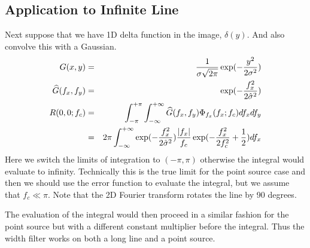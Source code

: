 \documentclass{article}
\DeclarePairedDelimiter\abs{\lvert}{\rvert}%
\begin{document}
\subsection{Application to Infinite Line}
Next suppose that we have 1D delta function in the image, $ \delta(y) $. And also convolve this with a Gaussian.
\begin{eqnarray}
	G(x,y) & = & \frac{1}{\sigma \sqrt{2 \pi}} \exp(-\frac{y^2}{2\sigma^2}) \\
	\widehat{G}(f_x,f_y) & = & \exp(-\frac{f_x^2}{2 \hat{\sigma}^2}) \\
	R(0,0; f_c) & = & \int_{-\pi}^{+\pi} \int_{-\infty}^{+\infty} \widehat{G}(f_x,f_y) \Phi_{f_x}(f_x; f_c) df_x df_y \\
    & = & 2 \pi \int_{-\infty}^{+\infty} \exp(-\frac{f_x^2}{2\hat{\sigma}^2})  \frac{\abs {f_x}}{f_c} \exp(-\frac{f_x^2}{2f_c^2}+\frac{1}{2}) df_x  \\
\end{eqnarray}
Here we switch the limits of integration to $ (-\pi,\pi) $ otherwise the integral would evaluate to infinity. Technically this is the true limit for the point source case and then we should use the error function to evaluate the integral, but we assume that $ f_c \ll \pi $. Note that the 2D Fourier transform rotates the line by 90 degrees.
\par
The evaluation of the integral would then proceed in a similar fashion for the point source but with a different constant multiplier before the integral. Thus the width filter works on both a long line and a point source.
\end{document}

